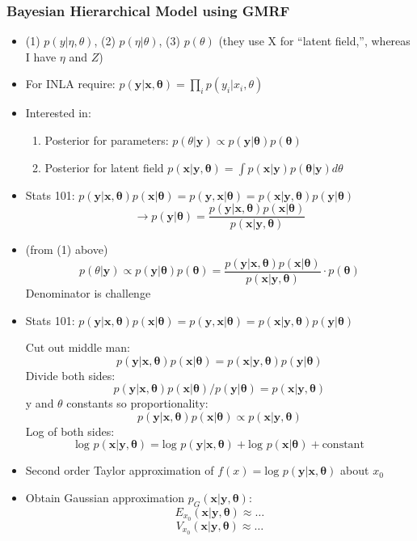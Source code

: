 \documentclass{article}
\begin{document}
\subsubsection*{Bayesian Hierarchical Model using GMRF}
\begin{itemize}
\item (1) $p(y|\eta, \theta)$, (2) $p(\eta|\theta)$, (3) $p(\theta)$ (they use X for ``latent field,'', whereas I have $\eta$ and $Z$)
\item For INLA require: $p(\pmb{y}|\pmb{x}, \pmb{\theta}) = \prod_{i} p(y_{i}|x_{i},\theta) $
\item Interested in:
  \begin{enumerate}
  \item Posterior for parameters: $p(\theta|\pmb{y}) \propto p(\pmb{y}|\pmb{\theta})p(\pmb{\theta})$
  \item Posterior for latent field $p(\pmb{x} | \pmb{y}, \pmb{\theta}) = \int p(\pmb{x} | \pmb{y}) p(\pmb{\theta}|\pmb{y}) d\theta$
  \end{enumerate}
\item Stats 101: $p(\pmb{y} | \pmb{x}, \pmb{\theta}) p(\pmb{x} | \pmb{\theta}) =
p(\pmb{y} , \pmb{x} | \pmb{\theta}) = p(\pmb{x} | \pmb{y}, \pmb{\theta}) p(\pmb{y} | \pmb{\theta})$
$$\rightarrow p(\pmb{y} | \pmb{\theta}) = \frac{p(\pmb{y} | \pmb{x}, \pmb{\theta}) p(\pmb{x} | \pmb{\theta})}{p(\pmb{x} | \pmb{y}, \pmb{\theta})}$$

\item (from (1) above) $$p(\theta|\pmb{y}) \propto p(\pmb{y}|\pmb{\theta})p(\pmb{\theta}) = \frac{p(\pmb{y} | \pmb{x}, \pmb{\theta}) p(\pmb{x} | \pmb{\theta})}{p(\pmb{x} | \pmb{y}, \pmb{\theta})} \cdot p(\pmb{\theta})$$ Denominator is challenge

\item Stats 101: $p(\pmb{y} | \pmb{x}, \pmb{\theta}) p(\pmb{x} | \pmb{\theta}) =
p(\pmb{y} , \pmb{x} | \pmb{\theta}) = p(\pmb{x} | \pmb{y}, \pmb{\theta}) p(\pmb{y} | \pmb{\theta})$

Cut out middle man:
$$p(\pmb{y} | \pmb{x}, \pmb{\theta}) p(\pmb{x} | \pmb{\theta}) = p(\pmb{x} | \pmb{y}, \pmb{\theta}) p(\pmb{y} | \pmb{\theta})$$
Divide both sides:
$$p(\pmb{y} | \pmb{x}, \pmb{\theta}) p(\pmb{x} | \pmb{\theta})/ p(\pmb{y} | \pmb{\theta})=  p(\pmb{x} | \pmb{y}, \pmb{\theta})$$
y and $\theta$ constants so proportionality:
$$p(\pmb{y} | \pmb{x}, \pmb{\theta}) p(\pmb{x} | \pmb{\theta}) \propto  p(\pmb{x} | \pmb{y}, \pmb{\theta})$$
Log of both sides:
$$\text{log } p(\pmb{x} | \pmb{y}, \pmb{\theta}) = \text{log } p(\pmb{y} | \pmb{x}, \pmb{\theta}) + \text{log } p(\pmb{x} | \pmb{\theta}) + \text{constant}$$
\item Second order Taylor approximation of $f(x) = \text{log } p(\pmb{y} | \pmb{x}, \pmb{\theta})$ about $x_{0}$
\item Obtain Gaussian approximation $p_{G}(\pmb{x} | \pmb{y}, \pmb{\theta})$:
$$ E_{x_{0}}(\pmb{x|y,\theta}) \approx \dots $$
$$  V_{x_{0}}(\pmb{x|y,\theta}) \approx \dots $$
\end{itemize}
\end{document}
